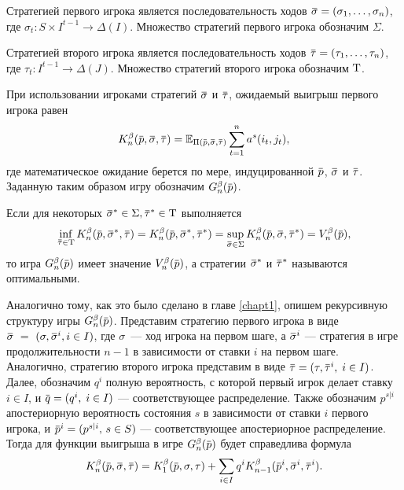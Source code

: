 {Стратегией первого игрока является последовательность ходов $\sigmav = (\sigma_1, \ldots, \sigma_n)$, где $\sigma_t: S \times I^{t-1} \rightarrow \Delta(I)$.
Множество стратегий первого игрока обозначим $\Sigma$.

Стратегией второго игрока является последовательность ходов $\tauv = (\tau_1, \ldots, \tau_n)$, где $\tau_t: I^{t-1} \rightarrow \Delta(J)$.
Множество стратегий второго игрока обозначим $\mathrm{T}$.

При использовании игроками стратегий $\sigmav$ и $\tauv$, ожидаемый выигрыш первого игрока равен
\begin{equation*}
  \K(\p, \sigmav, \tauv) =
  \E_{\Pi(\p, \sigmav, \tauv)} \sum_{t=1}^n a^s(i_t, j_t),
\end{equation*}
где математическое ожидание берется по мере, индуцированной $\p$, $\sigmav$ и $\tauv$.
Заданную таким образом игру обозначим $\theG(\p)$.

Если для некоторых $\sigmav^* \in \Sigma, \tauv^* \in \Tau$ выполняется
\begin{equation*}
  \inf_{\tauv \in \Tau} \K(\p, \sigmav^*, \tauv) =
  \K(\p, \sigmav^*, \tauv^*) =
  \sup_{\sigmav \in \Sigma} \K(\p, \sigmav, \tauv^*) = 
  \V(\p),
\end{equation*}
то игра $\theG(\p)$ имеет значение $\V(\p)$, а стратегии $\sigmav^*$ и $\tauv^*$
называются оптимальными.

Аналогично тому, как это было сделано в главе \ref{chapt1}, опишем рекурсивную структуру игры $\theG(\p)$.
Представим стратегию первого игрока в виде $\sigmav~=~(\sigma, \sigmav^i, i \in I)$,
где $\sigma$~--- ход игрока на первом шаге, а $\sigmav^i$ --- стратегия в игре
продолжительности $n-1$ в зависимости от ставки $i$ на первом шаге.
Аналогично, стратегию второго игрока представим в виде $\tauv = (\tau, \tauv^i, \; i \in I)$.
%
Далее, обозначим $q^i$ полную вероятность, с которой первый игрок делает ставку $i \in I$, и $\q = (q^i, \; i \in I)$ --- соответствующее распределение.
Также обозначим $p^{s|i}$ апостериорную вероятность состояния $s$ в зависимости от ставки $i$ первого игрока, и $\p^i = (p^{s|i}, \, s \in S)$ --- соответствующее апостериорное распределение.
Тогда для функции выигрыша в игре $\theG[n](\p)$ будет справедлива формула
\begin{equation}
  \label{problem:eq:Kn-recurrence}
  \K[n](\p, \sigmav, \tauv) =
  \K[1](\p, \sigma, \tau) +
  \sum_{i \in I} q^i \K[n-1](\p^i, \sigmav^i, \tauv^i).
\end{equation}

}
